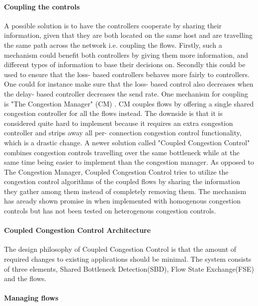 \documentclass[UKenglish]{ifimaster}
\begin{document}
\paragraph{Coupling the controls}
A possible solution is to have the controllers cooperate by sharing their information, given that they are both located on the same host and are travelling the same path across the network i.e. coupling the flows.
Firstly, such a mechanism could benefit both controllers by giving them more information, and different types of information to base their decisions on. 
Secondly this could be used to ensure that the loss- based controllers behaves more fairly to controllers.
One could for instance make sure that the loss- based control also decreases when the delay- based controller decreases the send rate.
One mechanism for coupling is "The Congestion Manager" (CM) \cite{rfc3124}.
CM couples flows by offering a single shared congestion controller for all the flows instead.
The downside is that it is considered quite hard to implement because it requires an extra congestion controller and strips away all per- connection congestion control functionality, which is a drastic change.
A newer solution called "Coupled Congestion Control" \cite{rfc8699} combines congestion controls travelling over the same bottleneck while at the same time being easier to implement than the congestion manager.
As opposed to The Congestion Manager, Coupled Congestion Control tries to utilize the congestion control algorithms of the coupled flows by sharing the information they gather among them instead of completely removing them. 
The mechanism has aready shown promise in \cite{10.1145/2740070.2630089, 7502803} when implemented with homogenous congestion controls but has not been tested on heterogenous congestion controls. 
\paragraph{Coupled Congestion Control Architecture}
The design philosophy of Coupled Congestion Control is that the amount of required changes to existing applications should be minimal. 
The system consists of three elements, Shared Bottleneck Detection(SBD), Flow State Exchange(FSE) and the flows. 

\paragraph{Managing flows}
\end{document}

